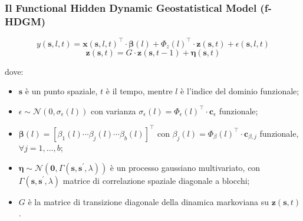 \begin{frame}
	\frametitle{Il Functional Hidden Dynamic Geostatistical Model (f-HDGM)}
	
	\begin{equation*}
		y(\mathbf{s}, l, t) = \mathbf{x}(\mathbf{s}, l, t)^\top\cdot\boldsymbol{\beta}(l) + \Phi_z(l)^\top\cdot \mathbf{z}(\mathbf{s}, t) + \epsilon(\mathbf{s}, l, t)
	\end{equation*}
	\begin{equation*}
		\mathbf{z}(\mathbf{s}, t) = G\cdot\mathbf{z}(\mathbf{s}, t-1) + \boldsymbol{\eta}(\mathbf{s}, t)
	\end{equation*}
	
	dove:
	\begin{itemize}
		\justifying
		\item $\mathbf{s}$ è un punto spaziale, $t$ è il tempo, mentre $l$ è l'indice del dominio funzionale;
		\item $\epsilon\sim\mathcal{N}(0, \sigma_\epsilon(l))$ con varianza $\sigma_\epsilon(l) = \Phi_\epsilon(l)^\top\cdot\mathbf{c}_\epsilon$ funzionale;
		\item $\boldsymbol{\beta}(l) = \left[\beta_1(l)\cdots\beta_j(l)\cdots\beta_b(l)\right]^\top$ con $\beta_j(l) = \Phi_\beta(l)^\top\cdot\mathbf{c}_{\beta, j}$ funzionale, $\forall j=1,\dots,b$;
		\item $\boldsymbol{\eta}\sim\mathcal{N}(\mathbf{0},\Gamma(\mathbf{s}, \mathbf{s}^\prime, \lambda))$ è un processo gaussiano multivariato, con $\Gamma(\mathbf{s}, \mathbf{s}^\prime, \lambda)$ matrice di correlazione spaziale diagonale a blocchi;
		\item $G$ è la matrice di transizione diagonale della dinamica markoviana su $\mathbf{z}(\mathbf{s}, t)$.
	\end{itemize}

\end{frame}